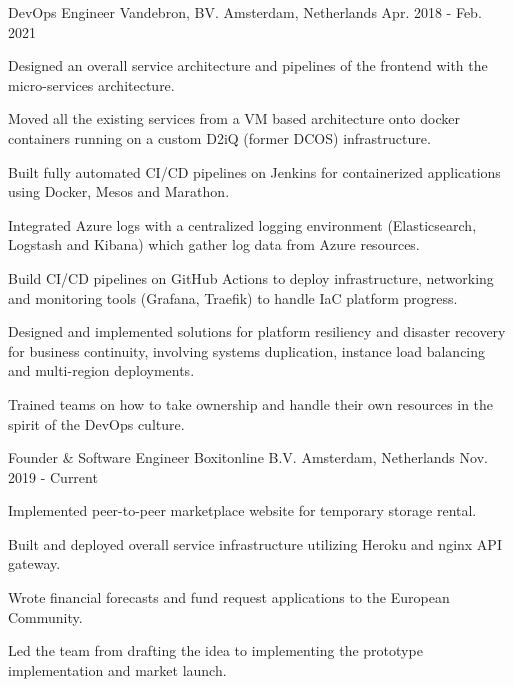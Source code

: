 \begin{cventries}
  \cventry
    {DevOps Engineer} %
    {Vandebron, BV.} %
    {Amsterdam, Netherlands} %
    {Apr. 2018 - Feb. 2021} %
    {
      \begin{cvitems} %
        \item {Designed an overall service architecture and pipelines of the frontend with the micro-services architecture.}
        \item {Moved all the existing services from a VM based architecture onto docker containers running on a custom D2iQ (former DCOS) infrastructure.}
        \item {Built fully automated CI/CD pipelines on Jenkins for containerized applications using Docker, Mesos and Marathon.}
        \item {Integrated Azure logs with a centralized logging environment (Elasticsearch, Logstash and Kibana) which gather log data from Azure resources.}
        \item {Build CI/CD pipelines on GitHub Actions to deploy infrastructure, networking and monitoring tools (Grafana, Traefik) to handle IaC platform progress.}
        \item {Designed and implemented solutions for platform resiliency and disaster recovery for business continuity, involving systems duplication, instance load balancing and multi-region deployments.}
        \item {Trained teams on how to take ownership and handle their own resources in the spirit of the DevOps culture.}
      \end{cvitems}
    }

  \cventry
    {Founder \& Software Engineer} %
    {Boxitonline B.V.} %
    {Amsterdam, Netherlands} %
    {Nov. 2019 - Current} %
    {
      \begin{cvitems} %
        \item {Implemented peer-to-peer marketplace website for temporary storage rental.}
        \item {Built and deployed overall service infrastructure utilizing Heroku and nginx API gateway.}
        \item {Wrote financial forecasts and fund request applications to the European Community.}
        \item {Led the team from drafting the idea to implementing the prototype implementation and market launch.}
      \end{cvitems}  
    }  
      

\end{cventries}
